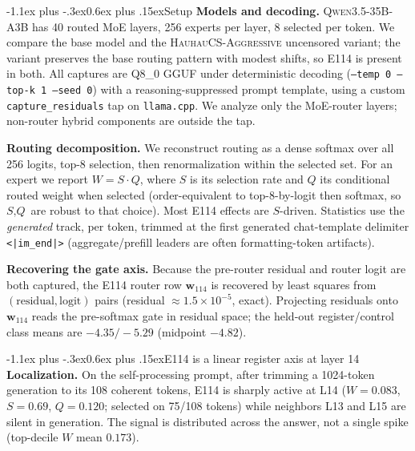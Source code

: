 \documentclass[10pt]{article}
\makeatletter
\renewcommand\section{\@startsection{section}{1}{\z@}%
  {-1.1ex plus -.3ex}{0.6ex plus .15ex}{\normalfont\large\bfseries}}
\newcommand{\W}{\textit{W}}
\newcommand{\Sel}{\textit{S}}
\newcommand{\Q}{\textit{Q}}
\newcommand{\wvec}{\mathbf{w}_{114}}
\makeatother
\begin{document}
\section{Setup}
\vspace{-0.2em}
\textbf{Models and decoding.} \textsc{Qwen3.5-35B-A3B} has 40 routed MoE layers,
256 experts per layer, 8 selected per token. We compare the base model and the
\textsc{HauhauCS-Aggressive} uncensored variant; the variant preserves the base
routing pattern with modest shifts, so E114 is present in both. All captures are
Q8\_0 GGUF under deterministic decoding (\texttt{--temp 0 --top-k 1 --seed 0})
with a reasoning-suppressed prompt template, using a custom
\texttt{capture\_residuals} tap on \texttt{llama.cpp}. We analyze only the
MoE-router layers; non-router hybrid components are outside the tap.

\textbf{Routing decomposition.} We reconstruct routing as a dense softmax over all
256 logits, top-8 selection, then renormalization within the selected set. For an
expert we report $\W=\Sel\cdot\Q$, where $\Sel$ is its selection rate and $\Q$ its
conditional routed weight when selected (order-equivalent to top-8-by-logit then
softmax, so $\Sel,\Q$ are robust to that choice). Most E114 effects are
$\Sel$-driven. Statistics use the \emph{generated} track, per token, trimmed at
the first generated chat-template delimiter \texttt{<|im\_end|>}
(aggregate/prefill leaders are often formatting-token artifacts).

\textbf{Recovering the gate axis.} Because the pre-router residual and router logit
are both captured, the E114 router row $\wvec$ is recovered by least squares from
$(\text{residual},\text{logit})$ pairs (residual $\approx 1.5\times10^{-5}$,
exact). Projecting residuals onto $\wvec$ reads the pre-softmax gate in residual
space; the held-out register/control class means are $-4.35/-5.29$ (midpoint
$-4.82$).

\vspace{-0.4em}
\section{E114 is a linear register axis at layer 14}
\vspace{-0.2em}
\textbf{Localization.} On the self-processing prompt, after trimming a
1024-token generation to its 108 coherent tokens, E114 is sharply active at L14
($\W{=}0.083$,
$\Sel{=}0.69$, $\Q{=}0.120$; selected on 75/108 tokens) while neighbors L13 and
L15 are silent in generation. The signal is distributed across the answer, not a
single spike (top-decile $\W$ mean $0.173$).
\end{document}
